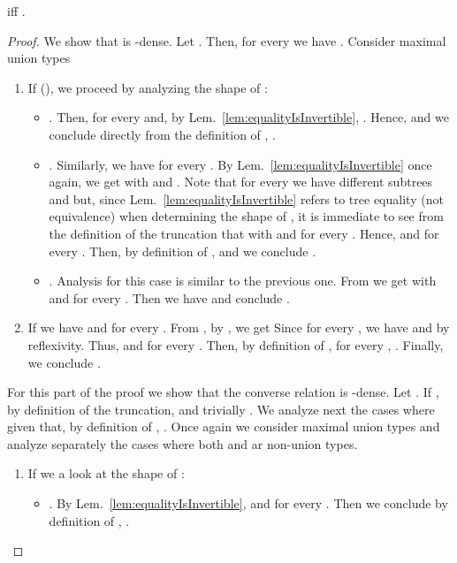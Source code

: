 \begin{lemma}
\label{lem:cutEquivalenceCo}
 iff .
\end{lemma}

\begin{proof}
 We show that  is -dense.
Let . Then, for every  we have
. Consider maximal union types 
\begin{enumerate}
  \item If  (\ie ), we proceed by
  analyzing the shape of :
  \begin{itemize}
    \item . Then,  for every  and, by
    Lem.~\ref{lem:equalityIsInvertible}, . Hence, 
    and we conclude directly from the definition of ,
    .
    
    \item . Similarly, we have  for every . By
    Lem.~\ref{lem:equalityIsInvertible} once again, we get  with  and
    . Note that for every  we have
    different subtrees  and  but, since
    Lem.~\ref{lem:equalityIsInvertible} refers to tree equality (not
    equivalence) when determining the shape of , it is immediate to see
    from the definition of the truncation that 
    with  and  for every
    . Hence,  and
     for every . Then, by
    definition of ,  and we
    conclude .
    
    \item . Analysis for this case is similar to
    the previous one. From  we get  with 
    and  for every . Then
    we have  and conclude
    .
  \end{itemize}
  
  \item If  we have  and  for every . From
  , by , we get 
  Since  for every , we have
   and  by reflexivity. Thus,  and  for
  every . Then, by definition of ,
   for every , . Finally, we conclude .
\end{enumerate}

 For this part of the proof we show that the converse relation  is -dense. Let . If , by definition of the truncation,  and trivially . We analyze next the cases where  given
that, by definition of , . Once again we consider
maximal union types  and analyze separately the cases where both  and  ar
non-union types.
\begin{enumerate}
  \item If  we a look at the shape of :
  \begin{itemize}
    \item . By Lem.~\ref{lem:equalityIsInvertible},  and
     for every . Then we conclude by definition of
    , .
    

\end{itemize}
\end{enumerate}
\end{proof}

